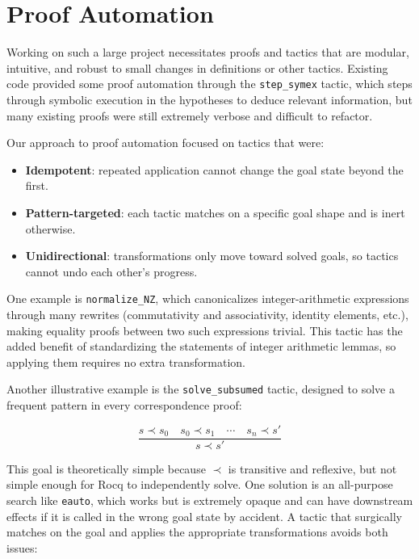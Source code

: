 \section{Proof Automation}
\label{sec:proof-automation}

Working on such a large project necessitates proofs and tactics that are modular, intuitive, and robust to small changes in definitions or other tactics.
Existing code provided some proof automation through the \texttt{step_symex} tactic, which steps through symbolic execution in the hypotheses to deduce relevant information, but many existing proofs were still extremely verbose and difficult to refactor. 

Our approach to proof automation focused on tactics that were:
  \begin{itemize}
      \item \textbf{Idempotent}: repeated application cannot change the goal state beyond the first.
      \item \textbf{Pattern-targeted}: each tactic matches on a specific goal shape and is inert otherwise.
      \item \textbf{Unidirectional}: transformations only move toward solved goals, so tactics cannot undo each other's progress.
  \end{itemize}

One example is \texttt{normalize_NZ}, which canonicalizes integer-arithmetic expressions through many rewrites (commutativity and associativity, identity elements, etc.), making equality proofs between two such expressions trivial.
This tactic has the added benefit of standardizing the statements of integer arithmetic lemmas, so applying them requires no extra transformation.

Another illustrative example is the \texttt{solve\_subsumed} tactic, designed to solve a frequent pattern in every correspondence proof: 

\[
  \frac{s \prec s_0 \quad s_0 \prec s_1 \quad \cdots \quad s_n \prec s'}{s \prec
   s'}
  \]

This goal is theoretically simple because $\prec$ is transitive and reflexive, but not simple enough for Rocq to independently solve.
One solution is an all-purpose search like \texttt{eauto}, which works but is extremely opaque and can have downstream effects if it is called in the wrong goal state by accident.
A tactic that surgically matches on the goal and applies the appropriate transformations avoids both issues:


